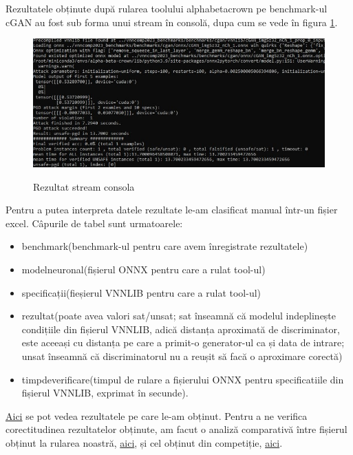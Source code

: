 \hspace{0.5 cm} Rezultatele obținute după rularea toolului alpha\textunderscore beta\textunderscore crown pe benchmark-ul cGAN au fost sub forma unui stream în consolă, dupa cum se vede în figura \ref{streamConsola}.

\begin{figure}[ht]
\centering
{\includegraphics[width=15cm]{imagini/streamConsola.jpeg}}
\caption{Rezultat stream consola}
\label{streamConsola}
\end{figure}

Pentru a putea interpreta datele rezultate le-am clasificat manual într-un fișier excel. Câpurile de tabel sunt urmatoarele: 
\begin{itemize}
\item benchmark(benchmark-ul pentru care avem înregistrate rezultatele)

\item model\textunderscore neuronal(fișierul ONNX pentru care a rulat tool-ul)

\item specificații(fieșierul VNNLIB pentru care a rulat tool-ul)

\item rezultat(poate avea valori sat/unsat; sat înseamnă că modelul indeplinește condițiile din fișierul VNNLIB, adică distanța aproximată de discriminator, este aceeași cu distanța pe care a primit-o generator-ul ca și data de intrare; unsat înseamnă că discriminatorul nu a reușit să facă o aproximare corectă)

\item timp\textunderscore de\textunderscore verificare(timpul de rulare a fișierului ONNX pentru specificatiile din fișierul VNNLIB, exprimat în secunde). 
\end{itemize}

\href{https://docs.google.com/spreadsheets/d/1kSxunni8qgQLT6ZkCRWvSO2VMy2Hz7qA/edit#gid=1476783028}{Aici} se pot vedea rezultatele pe care le-am obținut.
Pentru a ne verifica corectitudinea rezultatelor obținute, am facut o analiză comparativă între fișierul obținut la rularea noastră, \href{https://docs.google.com/spreadsheets/d/1kSxunni8qgQLT6ZkCRWvSO2VMy2Hz7qA/edit#gid=1476783028}{aici}, și cel obținut din competiție, \href{https://drive.google.com/file/d/1XolWcngRIGwjblvrm2a5FD2AqH8fVWgt/view?usp=drive_link}{aici}. 


